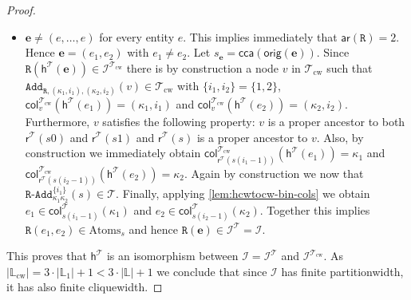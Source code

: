 \documentclass[10pt,a4paper]{amsart}
\theoremstyle{definition}
\numberwithin{equation}{section}
\theoremstyle{plain}
\theoremstyle{definition}
\theoremstyle{myexample}
\theoremstyle{plain}
\theoremstyle{definition}
\renewcommand{\vec}[1]{\boldsymbol{#1}}
\newcommand{\instance}{\mathcal{I}}
\newcommand{\inst}{\instance}
\newcommand{\origcol}{o}
\newcommand{\cols}{\mathbb{L}}
\newcommand{\arity}[1]{\fcn{ar}(#1)}
\newcommand{\radd}[4]{#4\pred{\texttt{-}Add}^{#3}_{#1#2}}
\newcommand{\unradd}[2]{#2\pred{\texttt{-}Add}_{#1}}
\newcommand{\partitionwidth}{par\-ti\-tion\-width}
\newcommand{\fcn}[1]{\mathsf{#1}}
\newcommand{\col}{\fcn{col}}
\newcommand{\pred}[1]{\mathtt{#1}}
\newcommand{\ve}{\vec{e}}
\newcommand{\rpred}{\pred{R}}
\newcommand{\shortto}{\hstretch{0.5}{\to}}
\begin{document}
\begin{proof}
\begin{itemize}
		\begin{itemize}
			\item $\fcn{r}^{\mathcal{T}}\!(s')$ is a proper ancestor of $v', v_{i}, v$,
			\item $v'$ is a proper ancestor of $v_{i}$ and $v$,
			\item $v_{i}$ is a proper ancestor of $v$,
			\item $\pred{Recolor}_{\origcol_1 \shortto (\origcol_1, i)}(v_{i})\in\mathcal{T}_{\mathrm{cw}}$,
			\item $\pred{Add}_{\rpred, (\origcol_1, i), (\origcol_1, i)}$ or $\pred{Add}_{\rpred, (\origcol_1, i)}$ depending on $\arity{\rpred} = 2$ or $\arity{\rpred} = 1$.
		\end{itemize}
		By construction we may obtain $\unradd{\origcol_2}{\rpred}^{i}(s')\in\mathcal{T}$ or  $\unradd{\origcol_1}{\rpred}^{i}(s')\in\mathcal{T}$ depending on $\arity{\rpred} = 2$ or $\arity{\rpred} = 1$. Consequently, $\rpred(\ve)\in\inst^{\mathcal{T}} = \inst$.
		\item $\ve \neq (e, \ldots, e)$ for every entity $e$. This implies immediately that $\arity{\rpred} = 2$. Hence $\ve = (e_1, e_2)$ with $e_1 \neq e_2$. Let $s_{\ve} = \fcn{cca}(\fcn{orig}(\ve))$. Since $\rpred(\fcn{h}^{\mathcal{T}}\!(\ve))\in\inst^{\mathcal{T}_{\mathrm{cw}}}$ there is by construction a node $v$ in $\mathcal{T}_{\mathrm{cw}}$ such that $\pred{Add}_{\rpred, (\kappa_1, i_1), (\kappa_2, i_2)}(v)\in\mathcal{T}_{\mathrm{cw}}$ with $\{ i_1, i_2 \} = \{ 1, 2 \}$, $ \col_{v}^{\mathcal{T}_{\mathrm{cw}}}(\fcn{h}^{\mathcal{T}}\!(e_{1})) = (\kappa_1, i_1)$ and $\col_{v}^{\mathcal{T}_{\mathrm{cw}}}(\fcn{h}^{\mathcal{T}}\!(e_{2})) = (\kappa_2, i_2)$. Furthermore, $v$ satisfies the following property: $v$ is a proper ancestor to both $\fcn{r}^{\mathcal{T}}\!(s0)$ and $\fcn{r}^{\mathcal{T}}\!(s1)$ and $\fcn{r}^{\mathcal{T}}\!(s)$ is a proper ancestor to $v$. Also, by construction we immediately obtain $ \col_{\fcn{r}^{\mathcal{T}}(s(i_1-1))}^{\mathcal{T}_{\mathrm{cw}}}(\fcn{h}^{\mathcal{T}}\!(e_{1})) = \kappa_1$ and $\col_{\fcn{r}^{\mathcal{T}}(s(i_2 - 1))}^{\mathcal{T}_{\mathrm{cw}}}(\fcn{h}^{\mathcal{T}}\!(e_{2})) = \kappa_2$. Again by construction we now that $\radd{\kappa_1}{\kappa_2}{\{i_1 \}}{\rpred}(s)\in\mathcal{T}$. Finally, applying \cref{lem:hcwtocw-bin-cols} we obtain $e_1\in\col_{s(i_1-1)}^{\mathcal{T}}(\kappa_1)$ and $e_2\in\col_{s(i_2-1)}^{\mathcal{T}}(\kappa_2)$. Together this implies $\rpred(e_1, e_2)\in\mathrm{Atoms}_{s}$ and hence $\rpred(\ve)\in\inst^{\mathcal{T}} = \inst$.
	\end{itemize}
	This proves that $\fcn{h}^{\mathcal{T}}$ is an isomorphism between $\inst = \inst^{\mathcal{T}}$ and $\inst^{\mathcal{T}_{\mathrm{cw}}}$. As $|\cols_{\mathrm{cw}}| = 3\cdot |\cols_1| + 1 < 3 \cdot |\cols| + 1$ we conclude that since $\inst$ has finite \partitionwidth{}, it has also finite cliquewidth.
\end{proof}
\end{document}
